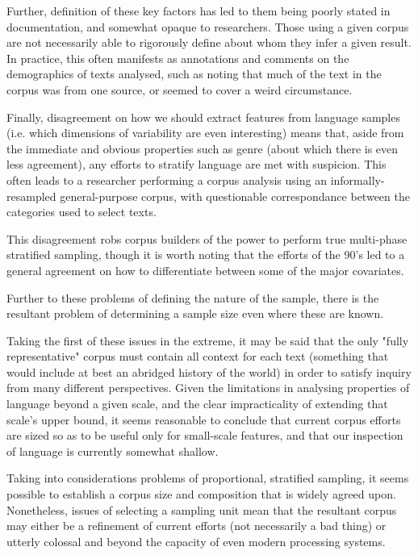 Further, definition of these key factors has led to them being poorly stated in documentation, and somewhat opaque to researchers.  Those using a given corpus are not necessarily able to rigorously define about whom they infer a given result.  In practice, this often manifests as annotations and comments on the demographics of texts analysed, such as noting that much of the text in the corpus was from one source, or seemed to cover a weird circumstance.



Finally, disagreement on how we should extract features from language samples (i.e. which dimensions of variability are even interesting) means that, aside from the immediate and obvious properties such as genre (about which there is even less agreement), any efforts to stratify language are met with suspicion.  This often leads to a researcher performing a corpus analysis using an informally-resampled general-purpose corpus, with questionable correspondance between the categories used to select texts.

This disagreement robs corpus builders of the power to perform true multi-phase stratified sampling, though it is worth noting that the efforts of the 90's led to a general agreement on how to differentiate between some of the major covariates.


Further to these problems of defining the nature of the sample, there is the resultant problem of determining a sample size even where these are known.  

Taking the first of these issues in the extreme, it may be said that the only "fully representative" corpus must contain all context for each text (something that would include at best an abridged history of the world) in order to satisfy inquiry from many different perspectives.  Given the limitations in analysing properties of language beyond a given scale, and the clear impracticality of extending that scale's upper bound, it seems reasonable to conclude that current corpus efforts are sized so as to be useful only for small-scale features, and that our inspection of language is currently somewhat shallow.

Taking into considerations problems of proportional, stratified sampling, it seems possible to establish a corpus size and composition that is widely agreed upon.  Nonetheless, issues of selecting a sampling unit mean that the resultant corpus may either be a refinement of current efforts (not necessarily a bad thing) or utterly colossal and beyond the capacity of even modern processing systems.

